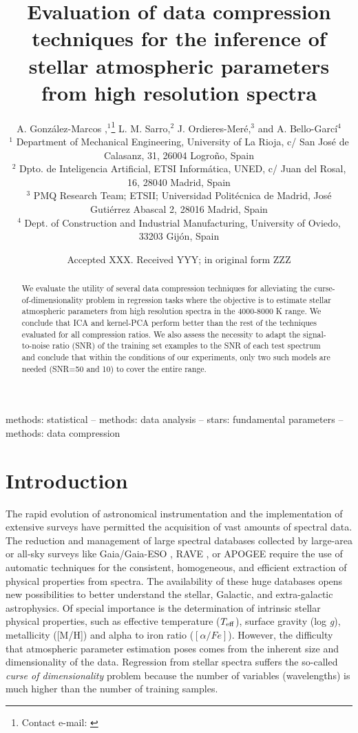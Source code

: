 \documentclass[a4paper,fleqn,usenatbib]{mnras}
\title[]{Evaluation of data compression techniques for the inference of
  stellar atmospheric parameters from high resolution spectra}
\author[A. Gonz\'alez-Marcos et al.]{
A. Gonz\'alez-Marcos ,$^{1}$\thanks{Contact e-mail: \href{mailto:}{}}
L. M. Sarro,$^{2}$
J. Ordieres-Mer\'e,$^{3}$
and A. Bello-Garc\'i$^{4}$
\\
$^{1}$ Department of Mechanical Engineering, University of La Rioja, c/ San Jos\'e de Calasanz, 31, 26004 Logroño, Spain  \\
$^{2}$ Dpto. de Inteligencia Artificial, ETSI Inform\'atica, UNED, c/ Juan del Rosal, 16, 28040 Madrid, Spain \\
$^{3}$ PMQ Research Team; ETSII; Universidad Polit\'ecnica de Madrid, José Guti\'errez Abascal 2, 28016 Madrid, Spain\\
$^{4}$ Dept. of Construction and Industrial Manufacturing, University of Oviedo, 33203 Gij\'on, Spain\\
}
\date{Accepted XXX. Received YYY; in original form ZZZ}
\begin{document}
\label{firstpage}
\pagerange{\pageref{firstpage}--\pageref{lastpage}}
\maketitle

\begin{abstract}
We evaluate the utility of several data compression techniques
  for alleviating the curse-of-dimensionality problem in regression
  tasks where the objective is to estimate stellar atmospheric
  parameters from high resolution spectra in the 4000-8000 K range. We
  conclude that ICA and kernel-PCA perform better than the rest of the
  techniques evaluated for all compression ratios. We also assess the
  necessity to adapt the signal-to-noise ratio (SNR) of the training
  set examples to the SNR of each test spectrum and conclude that
  within the conditions of our experiments, only two such models are
  needed (SNR=50 and 10) to cover the entire range.
\end{abstract}

\begin{keywords}
methods: statistical -- methods: data analysis -- stars: fundamental parameters -- methods: data compression
\end{keywords}



\section{Introduction}

The rapid evolution of astronomical instrumentation and the
implementation of extensive surveys have permitted the acquisition of
vast amounts of spectral data.  The reduction and management of large
spectral databases collected by large-area or all-sky surveys like
Gaia/Gaia-ESO \citep{2006MNRAS.367..290J,2012Msngr.147...25G}, RAVE
\citep{2006AJ....132.1645S}, or APOGEE \citep{2011AJ....142...72E}
require the use of automatic techniques for the consistent,
homogeneous, and efficient extraction of physical properties from
spectra. The availability of these huge databases opens new
possibilities to better understand the stellar, Galactic, and
extra-galactic astrophysics. Of special importance is the
determination of intrinsic stellar physical properties, such as
effective temperature ($T_{\rm eff}$), surface gravity (log
\textit{g}), metallicity ([M/H]) and alpha to iron ratio 
($\left[ \alpha/Fe \right]$). However, the difficulty that
atmospheric parameter estimation poses comes from the inherent size
and dimensionality of the data.  Regression from stellar spectra
suffers the so-called {\sl curse of dimensionality} problem because
the number of variables (wavelengths) is much higher than the number
of training samples. 
    
\end{document}
